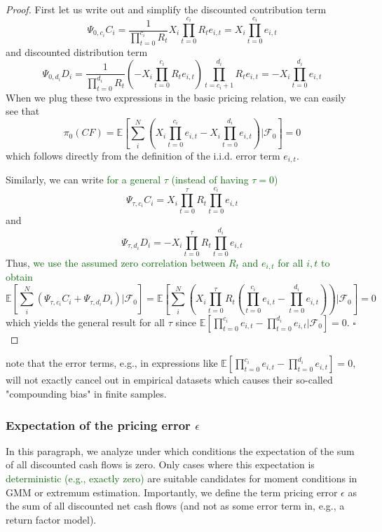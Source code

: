 \begin{proof}
	First let us write out and simplify the discounted contribution term
	\[
	\Psi_{0,c_i} C_i =
	\frac{1}{\prod_{t=0}^{c_i} R_t} X_i \prod_{t=0}^{c_i} R_t e_{i,t} =
	X_i \prod_{t=0}^{c_i} e_{i,t}
	\]
	and discounted distribution term
	\[
	\Psi_{0,d_i} D_i = \frac{1}{\prod_{t=0}^{d_i} R_t} \left( - X_i \prod_{t=0}^{c_i} R_t e_{i,t} \right) \prod_{t=c_i+1}^{d_i} R_t e_{i,t} = - X_i \prod_{t=0}^{d_i} e_{i,t}
	\]
	When we plug these two expressions in the basic pricing relation, we can easily see that
	\[
	\pi_0 \left( CF \right) =
	\mathbb{E} \left[ 
	\sum_i^N
	\left(
	X_i \prod_{t=0}^{c_i} e_{i,t} - X_i \prod_{t=0}^{d_i} e_{i,t}
	\right)
	\left| \mathcal{F}_{0} \right.
	\right] = 0
	\]
	which follows directly from the definition of the i.i.d. error term $e_{i,t}$.
	
	Similarly, we can write \textcolor{darkgreen}{for a general $\tau$ (instead of having $\tau=0$)}
	\[
	\Psi_{\tau,c_i} C_i =
	X_i \prod_{t=0}^{\tau} R_t \prod_{t=0}^{c_i} e_{i,t}
	\]
	and
	\[
	\Psi_{\tau,d_i} D_i = 
	- X_i \prod_{t=0}^{\tau} R_t \prod_{t=0}^{d_i} e_{i,t}
	\]
	Thus, \textcolor{darkgreen}{we use the assumed zero correlation between $R_t$ and $e_{i,t}$ for all $i,t$ to obtain}
	\[
	\mathbb{E} \left[ 
	\sum_i^N
	\left(
	\Psi_{\tau,c_i} C_i + \Psi_{\tau,d_i} D_i
	\right)
	\left| \mathcal{F}_{0} \right.
	\right] = 
	\mathbb{E} \left[ 
	\sum_i^N
	\left(
	X_i \prod_{t=0}^{\tau} R_t
	\left(
	\prod_{t=0}^{c_i} e_{i,t} - \prod_{t=0}^{d_i} e_{i,t}
	\right)
	\right)
	\left| \mathcal{F}_{0} \right.
	\right] = 0
	\]
	which yields the general result for all $\tau$ since $\mathbb{E} \left[ \prod_{t=0}^{c_i} e_{i,t} - \prod_{t=0}^{d_i} e_{i,t} \left| \mathcal{F}_{0} \right. \right]=0$.
	$\square$
\end{proof}


\begin{remark}
	\cite{GSW19} note that the error terms, e.g., in expressions like $\mathbb{E} \left[ \prod_{t=0}^{c_i} e_{i,t} - \prod_{t=0}^{d_i} e_{i,t} \right]=0$, will not exactly cancel out in empirical datasets which causes their so-called "compounding bias" in finite samples.
\end{remark}



\subsubsection{Expectation of the pricing error $\epsilon$}


In this paragraph, we analyze under which conditions the expectation of the sum of all discounted cash flows is zero.
Only cases where this expectation is \textcolor{darkgreen}{deterministic (e.g., exactly zero)} are suitable candidates for moment conditions in GMM or extremum estimation.
Importantly, we define the term pricing error $\epsilon$ as the sum of all discounted net cash flows (and not as some error term in, e.g., a return factor model).

